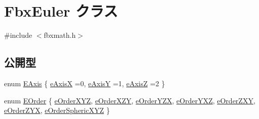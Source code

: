 \hypertarget{class_fbx_euler}{}\section{Fbx\+Euler クラス}
\label{class_fbx_euler}


{\ttfamily \#include $<$fbxmath.\+h$>$}

\subsection*{公開型}
\begin{DoxyCompactItemize}
\item 
enum \hyperlink{class_fbx_euler_ad021726fa17836ca3efd353ebc538f1a}{E\+Axis} \{ \hyperlink{class_fbx_euler_ad021726fa17836ca3efd353ebc538f1aad14972736ee1c99e5b6ee3d85b49892e}{e\+AxisX} =0, 
\hyperlink{class_fbx_euler_ad021726fa17836ca3efd353ebc538f1aa9e687ae4c2c8d8c1ce71869f6d2e3e4f}{e\+AxisY} =1, 
\hyperlink{class_fbx_euler_ad021726fa17836ca3efd353ebc538f1aaaa76dd8b9dce555038678e295faa5456}{e\+AxisZ} =2
 \}
\item 
enum \hyperlink{class_fbx_euler_a7d5bec7eedb022b4dae56894ab7a9939}{E\+Order} \{ \newline
\hyperlink{class_fbx_euler_a7d5bec7eedb022b4dae56894ab7a9939a826dcd420b1fcf49fac1f5ebbbf16894}{e\+Order\+X\+YZ}, 
\hyperlink{class_fbx_euler_a7d5bec7eedb022b4dae56894ab7a9939a1c9a8c3b3c41018cad46d8a13bd685bf}{e\+Order\+X\+ZY}, 
\hyperlink{class_fbx_euler_a7d5bec7eedb022b4dae56894ab7a9939a30a335e466b93120346e31cc67b0c7c4}{e\+Order\+Y\+ZX}, 
\hyperlink{class_fbx_euler_a7d5bec7eedb022b4dae56894ab7a9939afcbf96e502c9ad058f529644c66e385a}{e\+Order\+Y\+XZ}, 
\newline
\hyperlink{class_fbx_euler_a7d5bec7eedb022b4dae56894ab7a9939acf4d270ddd7ff69ebdd7fbeed8772c68}{e\+Order\+Z\+XY}, 
\hyperlink{class_fbx_euler_a7d5bec7eedb022b4dae56894ab7a9939a970a423237e1d2c9eff857092810448d}{e\+Order\+Z\+YX}, 
\hyperlink{class_fbx_euler_a7d5bec7eedb022b4dae56894ab7a9939abd5ec15c7fb9f6e05192fdf4ca8e487f}{e\+Order\+Spheric\+X\+YZ}
 \}
\end{DoxyCompactItemize}

